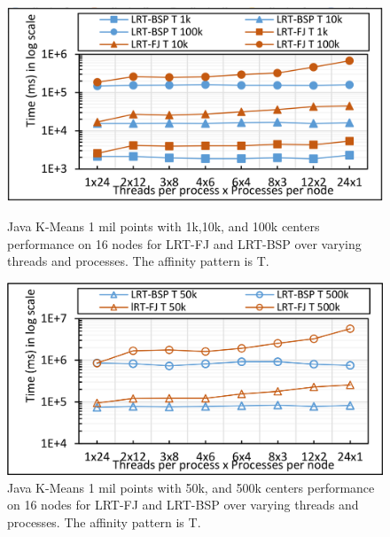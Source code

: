 \documentclass[10pt, conference, compsocconf]{IEEEtran}
\begin{document}
\begin{figure}[!htb]
	\begin{minipage}{0.49\textwidth}
        \centering
        \includegraphics[width=1\columnwidth]{images/fig_kmeans_1mil_varying_centers_by_10k_FJ_vs_BSP_T}
        \caption{Java K-Means 1 mil points with 1k,10k, and 100k centers performance on 16 nodes for \ac{LRT-FJ} and \ac{LRT-BSP} over varying threads and processes. The affinity pattern is T.}
        \label{fig:fig_kmeans_1mil_varying_centers_by_10k_FJ_vs_BSP_T}
    \end{minipage}
    \hspace{1.4mm}
    \begin{minipage}{0.49\textwidth}
        \centering
        \includegraphics[width=1\columnwidth]{images/fig_kmeans_1mil_varying_centers_as_50k_500k_FJ_vs_BSP_T}
        \caption{Java K-Means 1 mil points with 50k, and 500k centers performance on 16 nodes for \ac{LRT-FJ} and \ac{LRT-BSP} over varying threads and processes. The affinity pattern is T.}
        \label{fig:fig_kmeans_1mil_varying_centers_as_50k_500k_FJ_vs_BSP_T}
    \end{minipage}
\end{figure}
\end{document}
